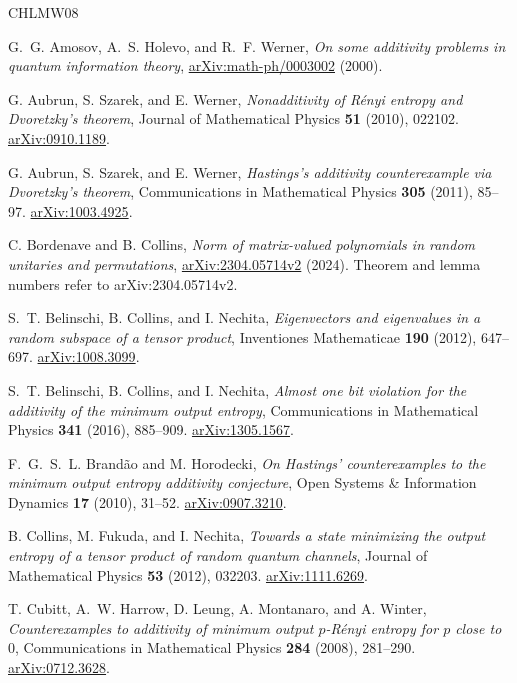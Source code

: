 \documentclass[11pt]{article}
\numberwithin{equation}{section}
\theoremstyle{boldremark}\newtheorem{remark}[theorem]{Remark}
\begin{document}
\begin{thebibliography}{CHLMW08}
\small
\raggedright
\setlength{\itemsep}{0pt}

G.~G. Amosov, A.~S. Holevo, and R.~F. Werner,
\emph{On some additivity problems in quantum information theory},
\href{https://arxiv.org/abs/math-ph/0003002}{arXiv:math-ph/0003002} (2000).

G. Aubrun, S. Szarek, and E. Werner,
\emph{Nonadditivity of R\'enyi entropy and Dvoretzky's theorem},
Journal of Mathematical Physics \textbf{51} (2010), 022102.
\href{https://arxiv.org/abs/0910.1189}{arXiv:0910.1189}.

G. Aubrun, S. Szarek, and E. Werner,
\emph{Hastings's additivity counterexample via Dvoretzky's theorem},
Communications in Mathematical Physics \textbf{305} (2011), 85--97.
\href{https://arxiv.org/abs/1003.4925}{arXiv:1003.4925}.

C. Bordenave and B. Collins,
\emph{Norm of matrix-valued polynomials in random unitaries and permutations},
\href{https://arxiv.org/abs/2304.05714v2}{arXiv:2304.05714v2} (2024).
Theorem and lemma numbers refer to arXiv:2304.05714v2.

S.~T. Belinschi, B. Collins, and I. Nechita,
\emph{Eigenvectors and eigenvalues in a random subspace of a tensor product},
Inventiones Mathematicae \textbf{190} (2012), 647--697.
\href{https://arxiv.org/abs/1008.3099}{arXiv:1008.3099}.

S.~T. Belinschi, B. Collins, and I. Nechita,
\emph{Almost one bit violation for the additivity of the minimum output entropy},
Communications in Mathematical Physics \textbf{341} (2016), 885--909.
\href{https://arxiv.org/abs/1305.1567}{arXiv:1305.1567}.

F.~G.~S.~L. Brand\~ao and M. Horodecki,
\emph{On Hastings' counterexamples to the minimum output entropy additivity conjecture},
Open Systems \& Information Dynamics \textbf{17} (2010), 31--52.
\href{https://arxiv.org/abs/0907.3210}{arXiv:0907.3210}.

B. Collins, M. Fukuda, and I. Nechita,
\emph{Towards a state minimizing the output entropy of a tensor product of random quantum channels},
Journal of Mathematical Physics \textbf{53} (2012), 032203.
\href{https://arxiv.org/abs/1111.6269}{arXiv:1111.6269}.

T. Cubitt, A.~W. Harrow, D. Leung, A. Montanaro, and A. Winter,
\emph{Counterexamples to additivity of minimum output $p$-R\'enyi entropy for $p$ close to $0$},
Communications in Mathematical Physics \textbf{284} (2008), 281--290.
\href{https://arxiv.org/abs/0712.3628}{arXiv:0712.3628}.


\end{thebibliography}
\end{document}
